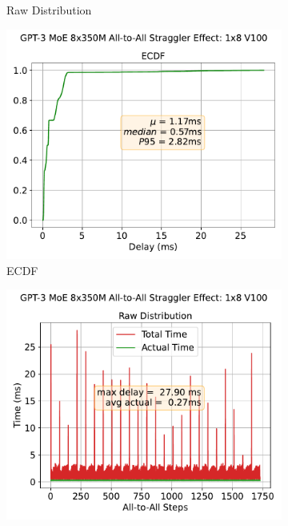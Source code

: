\begin{figure}[!h]
\begin{subfigure}{0.4\textwidth}
        \caption{Raw Distribution}
        \label{sub:raw_perl}
    \end{subfigure}
    \vspace{1em} %
    \begin{subfigure}{0.4\textwidth}
        \centering
        \includegraphics[width=\linewidth, keepaspectratio]{figures/GPT-3_MoE_8x350M_ecdf}
        \caption{ECDF}
        \label{sub:ecdf_az}
    \end{subfigure}
    \begin{subfigure}{0.4\textwidth}
        \centering
        \includegraphics[width=\linewidth, keepaspectratio]{figures/GPT-3_MoE_8x350M}

\end{subfigure}
\end{figure}
